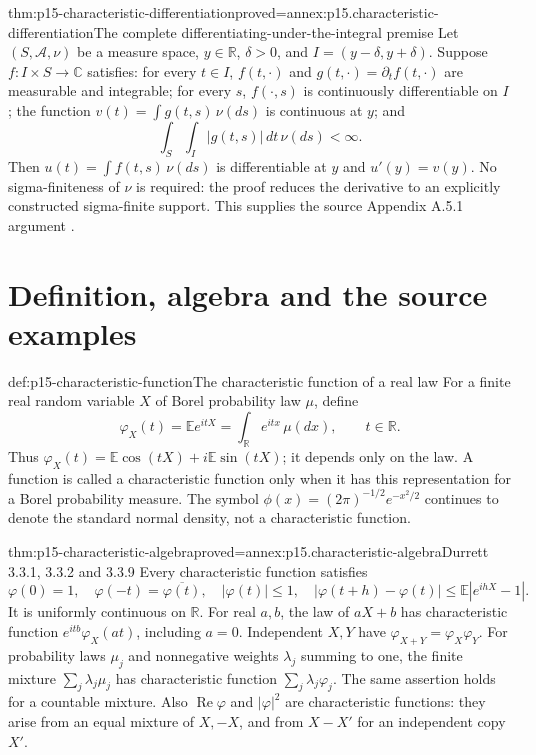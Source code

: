 \begin{hbtheorem}{thm:p15-characteristic-differentiation}{proved=annex:p15.characteristic-differentiation}{The complete differentiating-under-the-integral premise}
Let \((S,\mathcal A,\nu)\) be a measure space, \(y\in\mathbb R\),
\(\delta>0\), and \(I=(y-\delta,y+\delta)\).
Suppose \(f:I\times S\to\mathbb C\) satisfies:
for every \(t\in I\), \(f(t,\cdot)\) and
\(g(t,\cdot)=\partial_t f(t,\cdot)\) are measurable and
integrable; for every \(s\), \(f(\cdot,s)\) is continuously
differentiable on \(I\); the function
\(v(t)=\int g(t,s)\,\nu(ds)\) is continuous at \(y\); and
\[
 \int_S\int_I |g(t,s)|\,dt\,\nu(ds)<\infty.
\]
Then \(u(t)=\int f(t,s)\,\nu(ds)\) is differentiable at \(y\)
and \(u'(y)=v(y)\).
No sigma-finiteness of \(\nu\) is required: the proof reduces
the derivative to an explicitly constructed sigma-finite support.
This supplies the source Appendix A.5.1 argument
\cite[pp.~470--471]{DurrettPTEAuthor2019}.
\end{hbtheorem}

\section{Definition, algebra and the source examples}
\label{sec:p15-characteristic-definition-and-examples}

\begin{hbdefinition}{def:p15-characteristic-function}{The characteristic function of a real law}
For a finite real random variable \(X\) of Borel probability law
\(\mu\), define
\[
 \varphi_X(t)=\mathbb E e^{itX}
       =\int_{\mathbb R}e^{itx}\,\mu(dx),\qquad t\in\mathbb R.
\]
Thus \(\varphi_X(t)=\mathbb E\cos(tX)+i\mathbb E\sin(tX)\);
it depends only on the law. A function is called a
characteristic function only when it has this representation
for a Borel probability measure.
The symbol \(\phi(x)=(2\pi)^{-1/2}e^{-x^2/2}\) continues
to denote the standard normal density, not a characteristic
function.
\end{hbdefinition}

\begin{hbtheorem}{thm:p15-characteristic-algebra}{proved=annex:p15.characteristic-algebra}{Durrett 3.3.1, 3.3.2 and 3.3.9}
Every characteristic function satisfies
\[
 \varphi(0)=1,\quad \varphi(-t)=\overline{\varphi(t)},\quad
 |\varphi(t)|\leq1,\quad
 |\varphi(t+h)-\varphi(t)|\leq\mathbb E|e^{ihX}-1|.
\]
It is uniformly continuous on \(\mathbb R\).
For real \(a,b\), the law of \(aX+b\) has characteristic
function \(e^{itb}\varphi_X(at)\), including \(a=0\).
Independent \(X,Y\) have
\(\varphi_{X+Y}=\varphi_X\varphi_Y\).
For probability laws \(\mu_j\) and nonnegative weights
\(\lambda_j\) summing to one, the finite mixture
\(\sum_j\lambda_j\mu_j\) has characteristic function
\(\sum_j\lambda_j\varphi_j\).
The same assertion holds for a countable mixture.
Also \(\operatorname{Re}\varphi\) and \(|\varphi|^2\)
are characteristic functions: they arise from an equal mixture
of \(X,-X\), and from \(X-X'\) for an independent copy \(X'\).
\end{hbtheorem}

